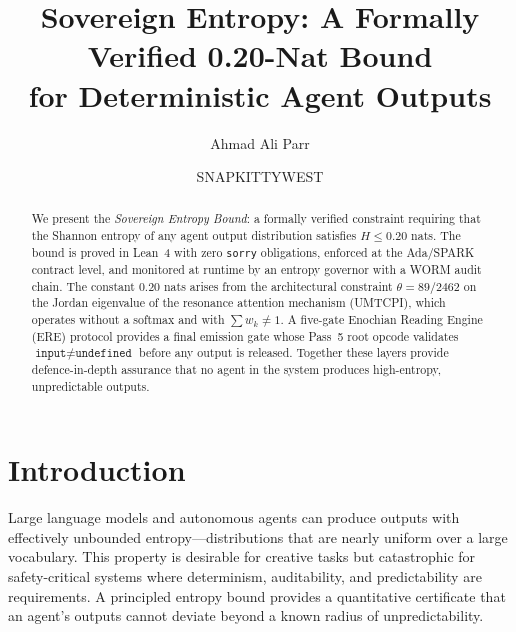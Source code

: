 \documentclass[sigconf,natbib=false]{acmart}
\begin{document}
\title{Sovereign Entropy: A Formally Verified 0.20-Nat Bound\\for Deterministic Agent Outputs}

\author{Ahmad Ali Parr}

\author{SNAPKITTYWEST}

\begin{abstract}
We present the \emph{Sovereign Entropy Bound}: a formally verified constraint
requiring that the Shannon entropy of any agent output distribution satisfies
$H \leq 0.20$ nats. The bound is proved in Lean~4 with zero \texttt{sorry}
obligations, enforced at the Ada/SPARK contract level, and monitored at runtime
by an entropy governor with a WORM audit chain. The constant $0.20$ nats arises
from the architectural constraint $\theta = 89/2462$ on the Jordan eigenvalue
of the resonance attention mechanism (UMTCPI), which operates without a softmax
and with $\sum w_k \neq 1$. A five-gate Enochian Reading Engine (ERE) protocol
provides a final emission gate whose Pass~5 root opcode validates
$\texttt{input} \neq \texttt{undefined}$ before any output is released. Together
these layers provide defence-in-depth assurance that no agent in the system
produces high-entropy, unpredictable outputs.
\end{abstract}


\maketitle


\section{Introduction}

Large language models and autonomous agents can produce outputs with effectively
unbounded entropy---distributions that are nearly uniform over a large
vocabulary. This property is desirable for creative tasks but catastrophic for
safety-critical systems where determinism, auditability, and predictability are
requirements. A principled entropy bound provides a quantitative certificate that
an agent's outputs cannot deviate beyond a known radius of unpredictability.
\end{document}
